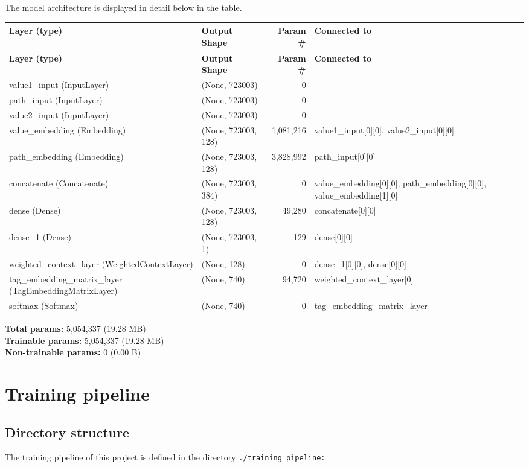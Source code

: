 \documentclass[10pt,english,a4paper]{report}
\begin{document}
The model architecture is displayed in detail below in the table.
\begin{longtable}{|p{4cm}|p{5cm}|r|p{4cm}|}
\hline
\textbf{Layer (type)} & \textbf{Output Shape} & \textbf{Param \#} & \textbf{Connected to} \\
\hline
\endfirsthead
\hline
\textbf{Layer (type)} & \textbf{Output Shape} & \textbf{Param \#} & \textbf{Connected to} \\
\hline
\endhead
value1\_input (InputLayer) & (None, 723003) & 0 & - \\
\hline
path\_input (InputLayer) & (None, 723003) & 0 & - \\
\hline
value2\_input (InputLayer) & (None, 723003) & 0 & - \\
\hline
value\_embedding (Embedding) & (None, 723003, 128) & 1,081,216 & value1\_input[0][0], value2\_input[0][0] \\
\hline
path\_embedding (Embedding) & (None, 723003, 128) & 3,828,992 & path\_input[0][0] \\
\hline
concatenate (Concatenate) & (None, 723003, 384) & 0 & value\_embedding[0][0], path\_embedding[0][0], value\_embedding[1][0] \\
\hline
dense (Dense) & (None, 723003, 128) & 49,280 & concatenate[0][0] \\
\hline
dense\_1 (Dense) & (None, 723003, 1) & 129 & dense[0][0] \\
\hline
weighted\_context\_layer (WeightedContextLayer) & (None, 128) & 0 & dense\_1[0][0], dense[0][0] \\
\hline
tag\_embedding\_matrix\_layer (TagEmbeddingMatrixLayer) & (None, 740) & 94,720 & weighted\_context\_layer[0] \\
\hline
softmax (Softmax) & (None, 740) & 0 & tag\_embedding\_matrix\_layer \\
\hline
\end{longtable}

\noindent \textbf{Total params:} 5,054,337 (19.28 MB) \\
\textbf{Trainable params:} 5,054,337 (19.28 MB) \\
\textbf{Non-trainable params:} 0 (0.00 B)


\section{Training pipeline}

\subsection{Directory structure}
The training pipeline of this project is defined in the directory \texttt{./training\_pipeline:}
\end{document}
